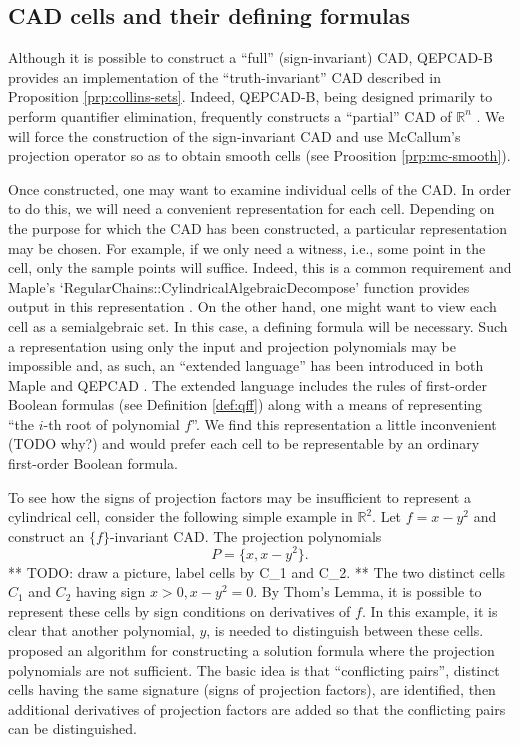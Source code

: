 \documentclass[
]{book}
\theoremstyle{definition}
\theoremstyle{definition}
\theoremstyle{definition}
\theoremstyle{definition}
\theoremstyle{remark}
\begin{document}
\hypertarget{sec:cell-formula}{%
\subsection{CAD cells and their defining formulas}\label{sec:cell-formula}}

Although it is possible to construct a ``full'' (sign-invariant) CAD, QEPCAD-B provides an implementation of the ``truth-invariant'' CAD described in Proposition \ref{prp:collins-sets}. Indeed, QEPCAD-B, being designed primarily to perform quantifier elimination, frequently constructs a ``partial'' CAD of \(\mathbb{R}^n\) \citep{brownQepcad}.
We will force the construction of the sign-invariant CAD and use McCallum's projection operator so as to obtain smooth cells (see Proosition \ref{prp:mc-smooth}).

Once constructed, one may want to examine individual cells of the CAD.
In order to do this, we will need a convenient representation for each cell.
Depending on the purpose for which the CAD has been constructed, a particular representation may be chosen. For example, if we only need a witness, i.e., some point in the cell, only the sample points will suffice. Indeed, this is a common requirement and Maple's `RegularChains::CylindricalAlgebraicDecompose' function provides output in this representation \citep{chen2014}.
On the other hand, one might want to view each cell as a semialgebraic set. In this case, a defining formula will be necessary.
Such a representation using only the input and projection polynomials may be impossible and, as such, an ``extended language'' has been introduced in both Maple and QEPCAD \citep[\citet{brownQepcad}]{chen2014}. The extended language includes the rules of first-order Boolean formulas (see Definition \ref{def:qff}) along with a means of representing ``the \(i\)-th root of polynomial \(f\)''. We find this representation a little inconvenient (TODO why?) and would prefer each cell to be representable by an ordinary first-order Boolean formula.

To see how the signs of projection factors may be insufficient to represent a cylindrical cell, consider the following simple example in \(\mathbb{R}^2\).
Let \(f = x - y^2\) and construct an \(\{f\}\)-invariant CAD. The projection polynomials
\[
P = \{ x, x - y^2 \}.
\]
** TODO: draw a picture, label cells by C\_1 and C\_2. **
The two distinct cells \(C_1\) and \(C_2\) having sign \(x > 0, x - y^2 = 0\). By Thom's Lemma, it is possible to represent these cells by sign conditions on derivatives of \(f\).
In this example, it is clear that another polynomial, \(y\), is needed to distinguish between these cells. \citet{brown99} proposed an algorithm for constructing a solution formula where the projection polynomials are not sufficient. The basic idea is that ``conflicting pairs'', distinct cells having the same signature (signs of projection factors), are identified, then additional derivatives of projection factors are added so that the conflicting pairs can be distinguished.
\end{document}
